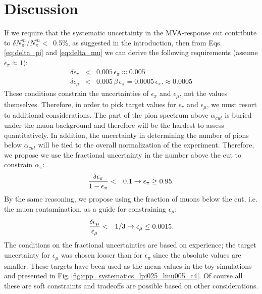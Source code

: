 \documentclass[12pt]{article}
\begin{document}
\section{Discussion}
If we require that the systematic uncertainty in the MVA-response cut 
contribute to $\delta N_\pi^m$/$N_\pi^m <$~0.5\%, as suggested in the introduction, then from
Eqs.\,\ref{eq:delta_pi} and \ref{eq:delta_mu} we can derive the following requirements (assume $\epsilon_\pi\approx 1$):
\begin{eqnarray}
\delta \epsilon_\pi & < & 0.005 \, \epsilon_\pi   \approx 0.005 \\      \label{eq:req_pi}
\delta \epsilon_\mu  & < & 0.005 \,\beta \,\epsilon_\pi = 0.0005 \, \epsilon_\pi.   \approx 0.0005  \label{eq:req_mu}
\end{eqnarray}
These conditions constrain the uncertainties of $\epsilon_\pi$ and $\epsilon_\mu$, not the values themselves. Therefore, in order to pick target values for $\epsilon_\pi$ and $\epsilon_\mu$, we must resort to additional considerations.  The part of the pion spectrum above $\alpha_{cut}$ is buried under the muon background and therefore will be the hardest to assess quantitatively. In addition, the uncertainty in determining the number of pions below $\alpha_{cut}$ will be tied to the overall normalization of the experiment. Therefore, we propose we use the fractional uncertainty in the number above the cut to constrain $\alpha_\pi$:
\begin{eqnarray}
{\delta \epsilon_\pi \over 1 - \epsilon_\pi} & < & 0.1 \rightarrow \epsilon_\pi \geq 0.95.
\end{eqnarray}
By the same reasoning, we propose using the fraction of muons below the cut, i.e. the muon contamination, as a guide for constraining $\epsilon_\mu$: 
\begin{eqnarray}
{\delta \epsilon_\mu \over \epsilon_\mu} & < & 1/3 \rightarrow \epsilon_\mu \leq 0.0015.
\end{eqnarray}
The conditions on the fractional uncertainties are based on experience; the target uncertainty for $\epsilon_\mu$ was chosen looser than for $\epsilon_\pi$ since the 
absolute values are smaller.
These targets have been used as the mean values in the toy simulations and presented in Fig.\,\ref{fig:cpp_systematics_lpi025_lmu005_c4}. Of course all these are soft constraints and tradeoffs are possible based on other considerations. 
\end{document}
